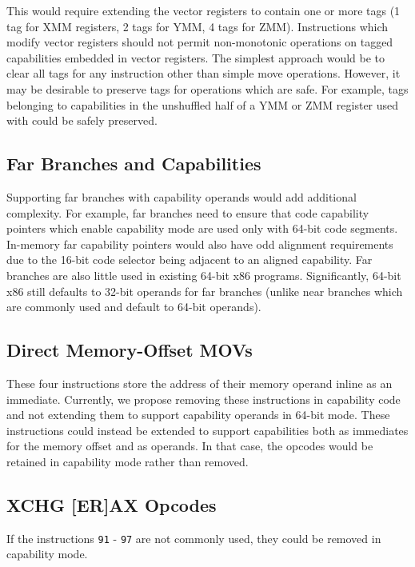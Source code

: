 This would require extending the vector registers to contain one or
more tags (1 tag for XMM registers, 2 tags for YMM, 4 tags for ZMM).
Instructions which modify vector registers should not permit
non-monotonic operations on tagged capabilities embedded in vector
registers.  The simplest approach would be to clear all tags for any
instruction other than simple move operations.  However, it may be
desirable to preserve tags for operations which are safe.  For
example, tags belonging to capabilities in the unshuffled half of a
YMM or ZMM register used with  could be safely
preserved.

\subsection{Far Branches and Capabilities}

Supporting far branches with capability operands would add additional
complexity.  For example, far branches need to ensure that code
capability pointers which enable capability mode are used only with
64-bit code segments.  In-memory far capability pointers would also
have odd alignment requirements due to the 16-bit code selector being
adjacent to an aligned capability.  Far branches are also little used
in existing 64-bit x86 programs.  Significantly, 64-bit x86 still
defaults to 32-bit operands for far branches (unlike near branches
which are commonly used and default to 64-bit operands).

\subsection{Direct Memory-Offset MOVs}

These four  instructions store the address of their
memory operand inline as an immediate.  Currently, we propose
removing these instructions in capability code and not extending
them to support capability operands in 64-bit mode.  These instructions could instead
be extended to support capabilities both as immediates for the memory
offset and as operands.  In that case, the opcodes would be retained
in capability mode rather than removed.

\subsection{XCHG [ER]AX Opcodes}

If the  instructions \texttt{91} - \texttt{97} are not
commonly used, they could be removed in capability mode.

